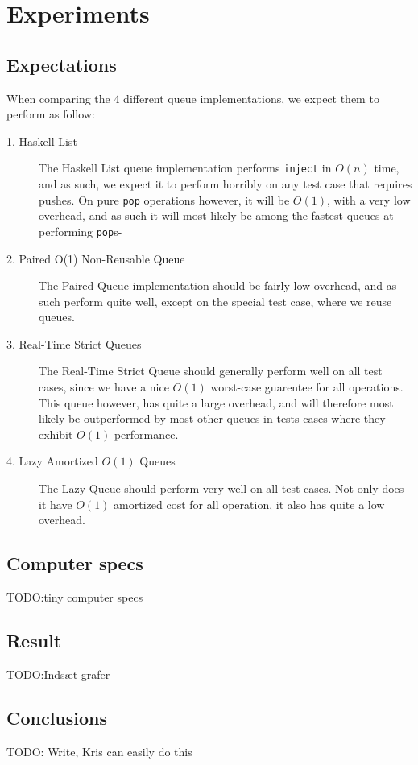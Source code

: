 
\section{Experiments}
\subsection{Expectations}
When comparing the 4 different queue implementations, we expect them to perform as follow:
\begin{description}

\item[1. Haskell List]
The Haskell List queue implementation performs \texttt{inject} in $O(n)$ time, and as such, we expect it to perform horribly on any test case that requires pushes.
On pure \texttt{pop} operations however, it will be $O(1)$, with a very low overhead, and as such it will most likely be among the fastest queues at performing \texttt{pop}s-
\item[2. Paired O(1) Non-Reusable Queue]
The Paired Queue implementation should be fairly low-overhead, and as such perform quite well, except on the special test case, where we reuse queues.
\item[3. Real-Time Strict Queues] 
The Real-Time Strict Queue should generally perform well on all test cases, since we have a nice $O(1)$ worst-case guarentee for all operations. This queue however, has quite a large overhead, and will therefore most likely be outperformed by most other queues in tests cases where they exhibit $O(1)$ performance. 
\item[4. Lazy Amortized $O(1)$ Queues]
The Lazy Queue should perform very well on all test cases. Not only does it have $O(1)$ amortized cost for all operation, it also has quite a low overhead. 

\end{description}

\subsection{Computer specs}

TODO:tiny computer specs

\subsection{Result}
TODO:Indsæt grafer 

\subsection{Conclusions}
 
 TODO: Write, Kris can easily do this